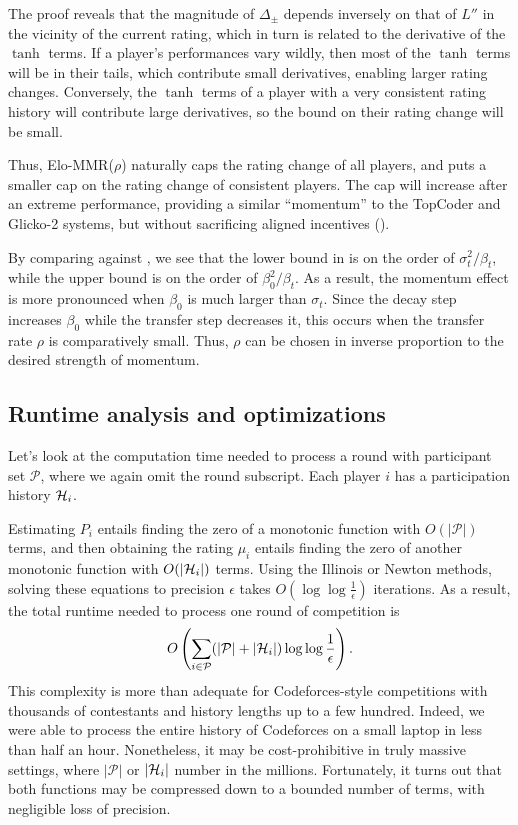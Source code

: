 The proof reveals that the magnitude of $\Delta_{\pm}$ depends inversely on that of $L''$ in the vicinity of the current rating, which in turn is related to the derivative of the $\tanh$ terms. If a player's performances vary wildly, then most of the $\tanh$ terms will be in their tails, which contribute small derivatives, enabling larger rating changes. Conversely, the $\tanh$ terms of a player with a very consistent rating history will contribute large derivatives, so the bound on their rating change will be small.

Thus, Elo-MMR($\rho$) naturally caps the rating change of all players, and puts a smaller cap on the rating change of consistent players. The cap will increase after an extreme performance, providing a similar ``momentum'' to the TopCoder and Glicko-2 systems, but without sacrificing aligned incentives ().

By comparing against , we see that the lower bound in  is on the order of $\sigma_t^2/\beta_t$, while the upper bound is on the order of $\beta_0^2/\beta_t$. As a result, the momentum effect is more pronounced when $\beta_0$ is much larger than $\sigma_t$. Since the decay step increases $\beta_0$ while the transfer step decreases it, this occurs when the transfer rate $\rho$ is comparatively small. Thus, $\rho$ can be chosen in inverse proportion to the desired strength of momentum.

\subsection{Runtime analysis and optimizations}
\label{sec:runtime}
Let's look at the computation time needed to process a round with participant set $\mathcal P$, where we again omit the round subscript. Each player $i$ has a participation history ${\mathcal{H}}_i$.

Estimating $P_i$ entails finding the zero of a monotonic function with $O(|\mathcal P|)$ terms, and then obtaining the rating $\mu_i$ entails finding the zero of another monotonic function with $O(|{\mathcal{H}}_i|)$ terms. Using the Illinois or Newton methods, solving these equations to precision $\epsilon$ takes $O(\log\log\frac 1\epsilon)$ iterations. As a result, the total runtime needed to process one round of competition is
\[O\left(\sum_{i\in\mathcal P}(|\mathcal P| + |{\mathcal{H}}_i|) \log\log\frac 1\epsilon\right).\]
This complexity is more than adequate for Codeforces-style competitions with thousands of contestants and history lengths up to a few hundred. Indeed, we were able to process the entire history of Codeforces on a small laptop in less than half an hour. Nonetheless, it may be cost-prohibitive in truly massive settings, where $|\mathcal P|$ or $|{\mathcal{H}}_i|$ number in the millions. Fortunately, it turns out that both functions may be compressed down to a bounded number of terms, with negligible loss of precision.

